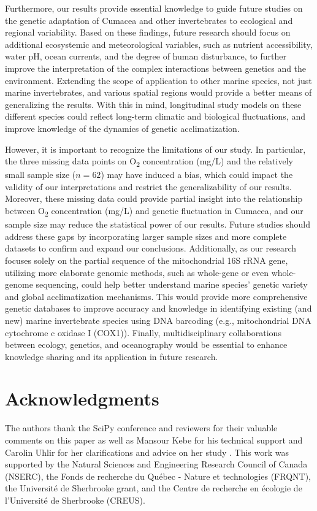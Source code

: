 Furthermore, our results provide essential knowledge to guide future studies on the genetic adaptation of Cumacea and other invertebrates to ecological and regional variability. Based on these findings, future research should focus on additional ecosystemic and meteorological variables, such as nutrient accessibility, water pH, ocean currents, and the degree of human disturbance, to further improve the interpretation of the complex interactions between genetics and the environment. Extending the scope of application to other marine species, not just marine invertebrates, and various spatial regions would provide a better means of generalizing the results. With this in mind, longitudinal study models on these different species could reflect long-term climatic and biological fluctuations, and improve knowledge of the dynamics of genetic acclimatization.

However, it is important to recognize the limitations of our study. In particular, the three missing data points on O\textsubscript{2} concentration (mg/L) and the relatively small sample size ($n=62$) may have induced a bias, which could impact the validity of our interpretations and restrict the generalizability of our results. Moreover, these missing data could provide partial insight into the relationship between O\textsubscript{2} concentration (mg/L) and genetic fluctuation in Cumacea, and our sample size may reduce the statistical power of our results. Future studies should address these gaps by incorporating larger sample sizes and more complete datasets to confirm and expand our conclusions. Additionally, as our research focuses solely on the partial sequence of the mitochondrial 16S rRNA gene, utilizing more elaborate genomic methods, such as whole-gene or even whole-genome sequencing, could help better understand marine species' genetic variety and global acclimatization mechanisms. This would provide more comprehensive genetic databases to improve accuracy and knowledge in identifying existing (and new) marine invertebrate species using DNA barcoding (e.g., mitochondrial DNA cytochrome c oxidase I (COX1)). Finally, multidisciplinary collaborations between ecology, genetics, and oceanography would be essential to enhance knowledge sharing and its application in future research.

\section{Acknowledgments}\label{acknowledgments}
The authors thank the SciPy conference and reviewers for their valuable comments on this paper as well as Mansour Kebe for his technical support and Carolin Uhlir for her clarifications and advice on her study \citep{uhlir_adding_2021}. This work was supported by the Natural Sciences and Engineering Research Council of Canada (NSERC), the Fonds de recherche du Québec - Nature et technologies (FRQNT), the Université de Sherbrooke grant, and the Centre de recherche en écologie de l’Université de Sherbrooke (CREUS).
